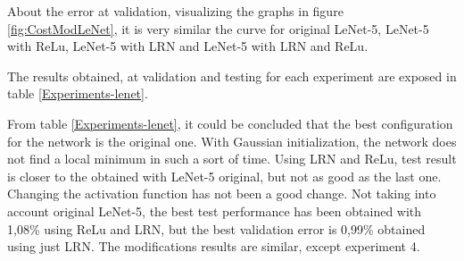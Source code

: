 About the error at validation, visualizing the graphs in figure \ref{fig:CostModLeNet}, it is very similar the curve for original LeNet-5, LeNet-5 with ReLu, LeNet-5 with LRN and LeNet-5 with LRN and ReLu.\\
\clearpage

The results obtained, at validation and testing for each experiment are exposed in table \ref{Experiments-lenet}. 

\begin{table}[htb]
\centering
{}
\caption{Lenet-5 experiments results.}
\label{Experiments-lenet}
\end{table}

From table \ref{Experiments-lenet}, it could be concluded that the best configuration for the network is the original one. With Gaussian initialization, the network does not find a local minimum in such a sort of time. Using LRN and ReLu, test result is closer to the obtained with LeNet-5 original, but not as good as the last one. Changing the activation function has not been a good change. Not taking into account original LeNet-5, the best test performance has been obtained with 1,08\% using ReLu and LRN, but the best validation error is 0,99\% obtained using just LRN. The modifications results are similar, except experiment 4.\\

